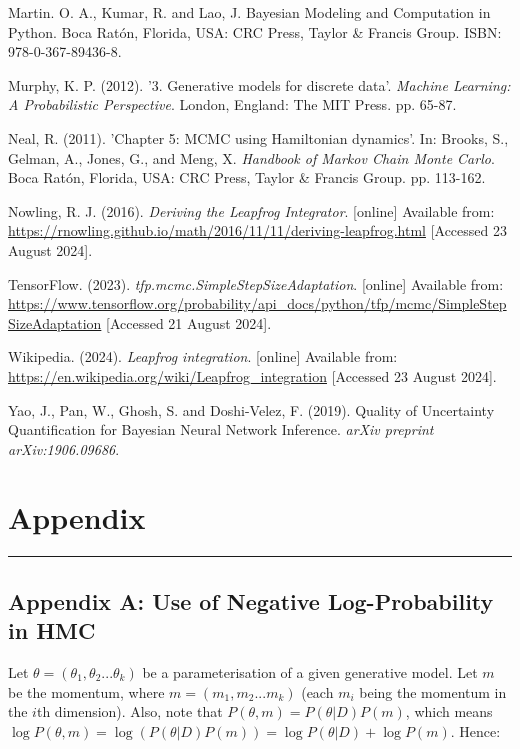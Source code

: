 \documentclass[conference]{IEEEtran}
\begin{document}
\begin{thebibliography}{00}
 Martin. O. A., Kumar, R. and Lao, J. Bayesian Modeling and Computation in Python. Boca Ratón, Florida, USA: CRC Press, Taylor \& Francis Group. ISBN: 978-0-367-89436-8.

 Murphy, K. P. (2012). '3. Generative models for discrete data'. \textit{Machine Learning: A Probabilistic Perspective}. London, England: The MIT Press. pp. 65-87.

 Neal, R. (2011). 'Chapter 5: MCMC using Hamiltonian dynamics'. In: Brooks, S., Gelman, A., Jones, G., and Meng, X. \textit{Handbook of Markov Chain Monte Carlo}. Boca Ratón, Florida, USA: CRC Press, Taylor \& Francis Group. pp. 113-162.

 Nowling, R. J. (2016). \textit{Deriving the Leapfrog Integrator}. [online] Available from: \url{https://rnowling.github.io/math/2016/11/11/deriving-leapfrog.html} [Accessed 23 August 2024].

 TensorFlow. (2023). \textit{tfp.mcmc.SimpleStepSizeAdaptation}. [online] Available from: \url{https://www.tensorflow.org/probability/api_docs/python/tfp/mcmc/SimpleStepSizeAdaptation} [Accessed 21 August 2024].

 Wikipedia. (2024). \textit{Leapfrog integration}. [online] Available from: \url{https://en.wikipedia.org/wiki/Leapfrog_integration} [Accessed 23 August 2024].

 Yao, J., Pan, W., Ghosh, S. and Doshi-Velez, F. (2019). Quality of Uncertainty Quantification for Bayesian Neural Network Inference. \textit{arXiv preprint arXiv:1906.09686}.

\end{thebibliography}
\vspace{12pt}

\section*{Appendix}

\par\noindent\rule{0.49\textwidth}{0.1pt}

\subsection*{Appendix A: Use of Negative Log-Probability in HMC}
Let $\theta = (\theta_1, \theta_2 ... \theta_k)$ be a parameterisation of a given generative model. Let $m$ be the momentum, where $m = (m_1, m_2 ... m_k)$ (each $m_i$ being the momentum in the $i$th dimension). Also, note that $P(\theta, m) = P(\theta|D)P(m)$, which means $\log P(\theta, m) = \log (P(\theta|D) P(m)) = \log P(\theta|D) + \log P(m)$. Hence:
\end{document}
